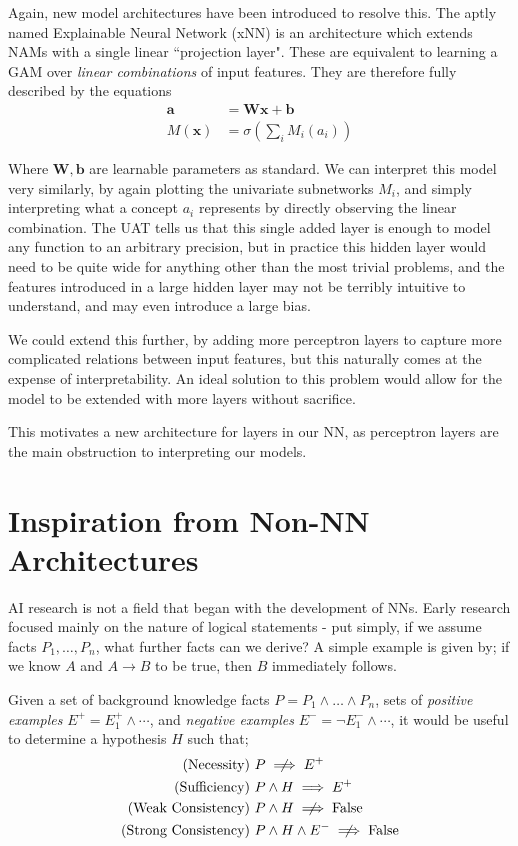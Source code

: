 \documentclass[conference]{report}
\begin{document}
Again, new model architectures have been introduced to resolve this. The aptly named Explainable Neural Network (xNN) \cite{xnn} is an architecture which extends NAMs with a single linear ``projection layer". These are equivalent to learning a GAM over \textit{linear combinations} of input features. They are therefore fully described by the equations
$$
\begin{aligned}
\mathbf{a} &= \mathbf{Wx + b}\\
M(\mathbf{x}) &= \sigma\left(\sum_i M_i(a_i)\right)
\end{aligned}
$$

Where $\mathbf{W}, \mathbf{b}$ are learnable parameters as standard. We can interpret this model very similarly, by again plotting the univariate subnetworks $M_i$, and simply interpreting what a concept $a_i$ represents by directly observing the linear combination. The UAT tells us that this single added layer is enough to model any function to an arbitrary precision, but in practice this hidden layer would need to be quite wide for anything other than the most trivial problems, and the features introduced in a large hidden layer may not be terribly intuitive to understand, and may even introduce a large bias.

We could extend this further, by adding more perceptron layers to capture more complicated relations between input features, but this naturally comes at the expense of interpretability. An ideal solution to this problem would allow for the model to be extended with more layers without sacrifice.

This motivates a new architecture for layers in our NN, as perceptron layers are the main obstruction to interpreting our models.

\section{Inspiration from Non-NN Architectures}

AI research is not a field that began with the development of NNs. Early research focused mainly on the nature of logical statements - put simply, if we assume facts $P_1, \dots, P_n$, what further facts can we derive? A simple example is given by; if we know $A$ and $A \rightarrow B$ to be true, then $B$ immediately follows.

Given a set of background knowledge facts $P = P_1 \land \dots \land P_n$, sets of \textit{positive examples} $E^+=E^+_1\land \cdots$, and \textit{negative examples} $E^-=\lnot E^-_1 \land \cdots$, it would be useful to determine a hypothesis $H$ such that;
$$
\begin{aligned}
    \text{(Necessity) } &P \centernot\implies E^+ \\
    \text{(Sufficiency) } &P \land H \implies E^+ \\
    \text{(Weak Consistency) } &P \land H \centernot\implies \text{False} \\ 
    \text{(Strong Consistency) } &P \land H \land E^- \centernot\implies \text{False} \\
\end{aligned}
$$
\end{document}
